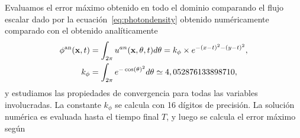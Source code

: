 Evaluamos el error máximo obtenido en todo el dominio 
comparando el flujo escalar dado por la ecuación~\eqref{eq:photondensity} 
obtenido numéricamente comparado con el obtenido analíticamente
\begin{equation*}
\begin{split}
\begin{aligned}
\phi^{\text{an}}(\mathbf{x},t)&=\int_{2\pi} u^{an}(\mathbf{x},\theta,t) d\theta=
k_{\phi}\times e^{-(x-t)^2-(y-t)^2},\\
k_{\phi}&=\int_{2\pi}e^{-\cos(\theta)^2}d\theta\simeq 4,052876133898710,
\end{aligned}
\end{split}
\label{eq:photondensityan}
\end{equation*}
y estudiamos las propiedades de convergencia 
para todas las variables involucradas. La constante 
$k_{\phi}$ se calcula con 16 dígitos de precisión. 
La solución numérica es evaluada hasta el tiempo final $T$, 
y luego se calcula el error máximo según
